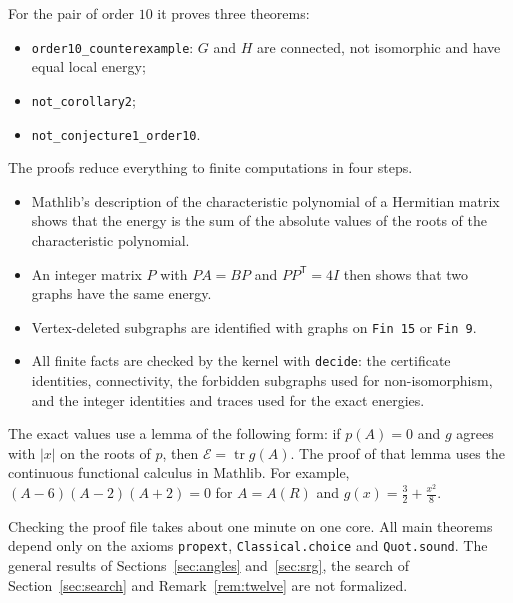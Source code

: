 \documentclass[11pt]{amsart}
\theoremstyle{remark}
\newcommand{\cE}{\mathcal{E}}
\DeclareMathOperator{\tr}{tr}
\begin{document}
For the pair of order $10$ it proves three theorems:
\begin{itemize}
\item \texttt{order10\_counterexample}: $G$ and $H$ are connected, not isomorphic and have equal local energy;
\item \texttt{not\_corollary2};
\item \texttt{not\_conjecture1\_order10}.
\end{itemize}

The proofs reduce everything to finite computations in four steps.
\begin{itemize}
\item Mathlib's description of the characteristic polynomial of a Hermitian matrix shows that the energy is the sum of the absolute values of the roots of the characteristic polynomial.
\item An integer matrix $P$ with $PA=BP$ and $PP^{\mathsf T}=4I$ then shows that two graphs have the same energy.
\item Vertex-deleted subgraphs are identified with graphs on \texttt{Fin 15} or \texttt{Fin 9}.
\item All finite facts are checked by the kernel with \texttt{decide}: the certificate identities, connectivity, the forbidden subgraphs used for non-isomorphism, and the integer identities and traces used for the exact energies.
\end{itemize}
The exact values use a lemma of the following form: if $p(A)=0$ and $g$ agrees with $|x|$ on the roots of $p$, then $\cE=\tr g(A)$.
The proof of that lemma uses the continuous functional calculus in Mathlib.
For example, $(A-6)(A-2)(A+2)=0$ for $A=A(R)$ and $g(x)=\tfrac32+\tfrac{x^2}8$.

Checking the proof file takes about one minute on one core.
All main theorems depend only on the axioms \texttt{propext}, \texttt{Classical.choice} and \texttt{Quot.sound}.
The general results of Sections~\ref{sec:angles} and~\ref{sec:srg}, the search of Section~\ref{sec:search} and Remark~\ref{rem:twelve} are not formalized.
\end{document}
